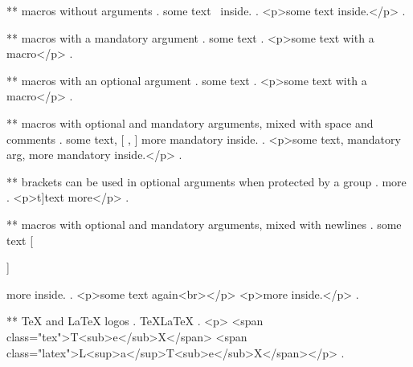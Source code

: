 ** macros without arguments
.
some text \echo\ inside.
.
<p>some text  inside.</p>
.

** macros with a mandatory argument
.
some text 
.
<p>some text with a macro</p>
.

** macros with an optional argument
.
some text 
.
<p>some text with a macro</p>
.


** macros with optional and mandatory arguments, mixed with space and comments
.
some text,  [%
,  %
 ]
 {more mandatory} inside.
.
<p>some text, mandatory arg, more mandatory inside.</p>
.


** brackets can be used in optional arguments when protected by a group
.
\echo[{t]}t]{ext} more
.
<p>t]text more</p>
.



** macros with optional and mandatory arguments, mixed with newlines
.
some text  [ %

 ]%

  {more} inside.
.
<p>some text again<br></p>
<p>more inside.</p>
.


** TeX and LaTeX logos
.
\TeX \LaTeX
.
<p>
<span class="tex">T<sub>e</sub>X</span>
<span class="latex">L<sup>a</sup>T<sub>e</sub>X</span></p>
.
